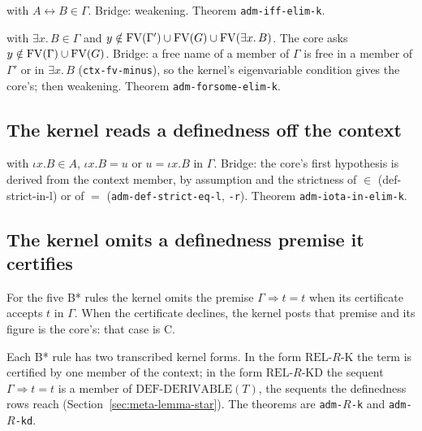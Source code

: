 with $A \leftrightarrow B \in \Gamma$.  Bridge: weakening.  Theorem
\texttt{adm-iff-elim-k}.

with $\exists x.\,B \in \Gamma$ and $y \notin \mathrm{FV}(\Gamma') \cup \mathrm{FV}(G)
\cup \mathrm{FV}(\exists x.\,B)$.  The core asks $y \notin \mathrm{FV}(\Gamma) \cup
\mathrm{FV}(G)$.  Bridge: a free name of a member of $\Gamma$ is free in a member
of $\Gamma'$ or in $\exists x.\,B$ (\texttt{ctx-fv-minus}), so the
kernel's eigenvariable condition gives the core's; then weakening.
Theorem \texttt{adm-forsome-elim-k}.

\subsection{The kernel reads a definedness off the context}

with $\iota x.B \in A$, $\iota x.B = u$ or $u = \iota x.B$ in $\Gamma$.
Bridge: the core's first hypothesis is derived from the context member,
by assumption and the strictness of $\in$ (def-strict-in-l) or of $=$
(\texttt{adm-def-strict-eq-l}, \texttt{-r}).  Theorem
\texttt{adm-iota-in-elim-k}.

\subsection{The kernel omits a definedness premise it certifies}

For the five B* rules the kernel omits the premise
$\Gamma \Longrightarrow t = t$ when its certificate accepts $t$ in
$\Gamma$.  When the certificate declines, the kernel posts that premise
and its figure is the core's: that case is C.

Each B* rule has two transcribed kernel forms.  In the form
$\mathrm{REL\text{-}}R\mathrm{\text{-}K}$ the term is certified by one
member of the context; in the form $\mathrm{REL\text{-}}R\mathrm{\text{-}KD}$
the sequent $\Gamma \Longrightarrow t = t$ is a member of
$\mathrm{DEF\text{-}DERIVABLE}(T)$, the sequents the definedness rows
reach (Section~\ref{sec:meta-lemma-star}).  The theorems are
\texttt{adm-}$R$\texttt{-k} and \texttt{adm-}$R$\texttt{-kd}.

